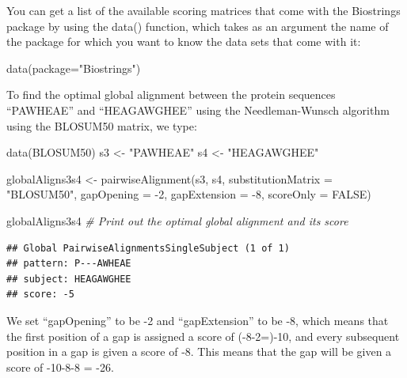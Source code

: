\documentclass[
]{book}
\newenvironment{Shaded}{\begin{snugshade}}{\end{snugshade}}
\newcommand{\AttributeTok}[1]{\textcolor[rgb]{0.77,0.63,0.00}{#1}}
\newcommand{\CommentTok}[1]{\textcolor[rgb]{0.56,0.35,0.01}{\textit{#1}}}
\newcommand{\ConstantTok}[1]{\textcolor[rgb]{0.00,0.00,0.00}{#1}}
\newcommand{\DecValTok}[1]{\textcolor[rgb]{0.00,0.00,0.81}{#1}}
\newcommand{\FunctionTok}[1]{\textcolor[rgb]{0.00,0.00,0.00}{#1}}
\newcommand{\NormalTok}[1]{#1}
\newcommand{\OtherTok}[1]{\textcolor[rgb]{0.56,0.35,0.01}{#1}}
\newcommand{\SpecialCharTok}[1]{\textcolor[rgb]{0.00,0.00,0.00}{#1}}
\newcommand{\StringTok}[1]{\textcolor[rgb]{0.31,0.60,0.02}{#1}}
\begin{document}
You can get a list of the available scoring matrices that come with the Biostrings package by using the data() function, which takes as an argument the name of the package for which you want to know the data sets that come with it:

\begin{Shaded}
\begin{Highlighting}[]
\FunctionTok{data}\NormalTok{(}\AttributeTok{package=}\StringTok{"Biostrings"}\NormalTok{)}
\end{Highlighting}
\end{Shaded}

To find the optimal global alignment between the protein sequences ``PAWHEAE'' and ``HEAGAWGHEE'' using the Needleman-Wunsch algorithm using the BLOSUM50 matrix, we type:

\begin{Shaded}
\begin{Highlighting}[]
\FunctionTok{data}\NormalTok{(BLOSUM50)}
\NormalTok{s3 }\OtherTok{\textless{}{-}} \StringTok{"PAWHEAE"}
\NormalTok{s4 }\OtherTok{\textless{}{-}} \StringTok{"HEAGAWGHEE"}
\end{Highlighting}
\end{Shaded}

\begin{Shaded}
\begin{Highlighting}[]
\NormalTok{globalAligns3s4 }\OtherTok{\textless{}{-}} \FunctionTok{pairwiseAlignment}\NormalTok{(s3, s4, }\AttributeTok{substitutionMatrix =} \StringTok{"BLOSUM50"}\NormalTok{, }\AttributeTok{gapOpening =} \SpecialCharTok{{-}}\DecValTok{2}\NormalTok{,}
\AttributeTok{gapExtension =} \SpecialCharTok{{-}}\DecValTok{8}\NormalTok{, }\AttributeTok{scoreOnly =} \ConstantTok{FALSE}\NormalTok{)}
\end{Highlighting}
\end{Shaded}

\begin{Shaded}
\begin{Highlighting}[]
\NormalTok{globalAligns3s4 }\CommentTok{\# Print out the optimal global alignment and its score}
\end{Highlighting}
\end{Shaded}

\begin{verbatim}
## Global PairwiseAlignmentsSingleSubject (1 of 1)
## pattern: P---AWHEAE
## subject: HEAGAWGHEE
## score: -5
\end{verbatim}

We set ``gapOpening'' to be -2 and ``gapExtension'' to be -8, which means that the first position of a gap is assigned a score of (-8-2=)-10, and every subsequent position in a gap is given a score of -8. This means that the gap will be given a score of -10-8-8 = -26.
\end{document}

